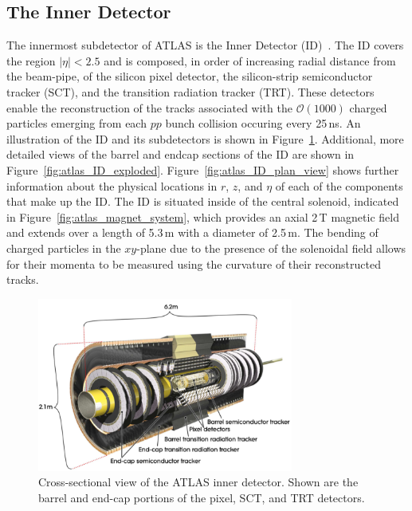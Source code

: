 \subsection{The Inner Detector}
\label{sec:inner_detector}

The innermost subdetector of ATLAS is the Inner Detector (ID)~\cite{Haywood:331064}.
The ID covers the region $\lvert \eta \rvert < 2.5$ and is composed, in order
of increasing radial distance from the beam-pipe, of the silicon pixel detector,
the silicon-strip semiconductor tracker (SCT), and the transition radiation tracker (TRT).
These detectors enable the reconstruction of the tracks associated with
the $\mathcal{O}(1000)$ charged particles emerging from each $pp$ bunch collision occuring
every 25\,ns.
An illustration of the ID and its subdetectors is shown in Figure~\ref{fig:atlas_inner_detector}.
Additional, more detailed views of the barrel and endcap sections of the ID are shown in Figure~\ref{fig:atlas_ID_exploded}.
Figure~\ref{fig:atlas_ID_plan_view} shows further information about the physical locations in $r$, $z$, and $\eta$
of each of the components that make up the ID.
The ID is situated inside of the central solenoid, indicated in Figure~\ref{fig:atlas_magnet_system},
which provides an axial 2\,T magnetic field and extends over a length of 5.3\,m with a diameter of 2.5\,m.
The bending of charged particles in the $xy$-plane due to the presence of the solenoidal
field allows for their momenta to be measured using the curvature of their reconstructed tracks.

\begin{figure}[!htb]
    \begin{center}
        \includegraphics[width=0.75\textwidth]{figures/chapter2/inner_detector/atlas_inner_detector}
        \caption{
            Cross-sectional view of the ATLAS inner detector. Shown are the barrel
            and end-cap portions of the pixel, SCT, and TRT detectors.
        }
        \label{fig:atlas_inner_detector}
    \end{center}
\end{figure}


